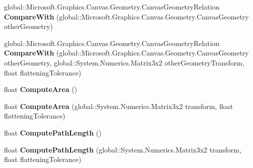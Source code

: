 \begin{DoxyCompactItemize}
global\+::\+Microsoft.\+Graphics.\+Canvas.\+Geometry.\+Canvas\+Geometry\+Relation {\bfseries Compare\+With} (global\+::\+Microsoft.\+Graphics.\+Canvas.\+Geometry.\+Canvas\+Geometry other\+Geometry)
\item 
\mbox{\label{interface_microsoft_1_1_graphics_1_1_canvas_1_1_geometry_1_1_i_canvas_geometry_a05b0590f7526c5e62b664f3c73b3f28e}} 
global\+::\+Microsoft.\+Graphics.\+Canvas.\+Geometry.\+Canvas\+Geometry\+Relation {\bfseries Compare\+With} (global\+::\+Microsoft.\+Graphics.\+Canvas.\+Geometry.\+Canvas\+Geometry other\+Geometry, global\+::\+System.\+Numerics.\+Matrix3x2 other\+Geometry\+Transform, float flattening\+Tolerance)
\item 
\mbox{\label{interface_microsoft_1_1_graphics_1_1_canvas_1_1_geometry_1_1_i_canvas_geometry_a0f5c0e7cc934073f79ef8689581c700e}} 
float {\bfseries Compute\+Area} ()
\item 
\mbox{\label{interface_microsoft_1_1_graphics_1_1_canvas_1_1_geometry_1_1_i_canvas_geometry_abccc0c3b05f197af6abf2a494662b435}} 
float {\bfseries Compute\+Area} (global\+::\+System.\+Numerics.\+Matrix3x2 transform, float flattening\+Tolerance)
\item 
\mbox{\label{interface_microsoft_1_1_graphics_1_1_canvas_1_1_geometry_1_1_i_canvas_geometry_a7b9a9d62779c0ffb9edae6b37d603e83}} 
float {\bfseries Compute\+Path\+Length} ()
\item 
\mbox{\label{interface_microsoft_1_1_graphics_1_1_canvas_1_1_geometry_1_1_i_canvas_geometry_a86d3efebb758fbccdb757cae6bd3be83}} 
float {\bfseries Compute\+Path\+Length} (global\+::\+System.\+Numerics.\+Matrix3x2 transform, float flattening\+Tolerance)
\item 
\mbox{\label{interface_microsoft_1_1_graphics_1_1_canvas_1_1_geometry_1_1_i_canvas_geometry_a8d6d3c32929175715f13de9f723e337c}} 

\end{DoxyCompactItemize}
